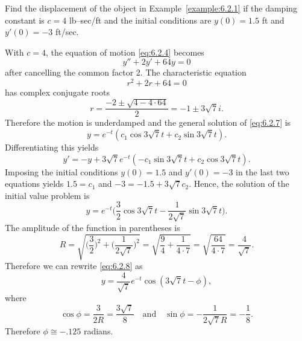 \documentclass{ximera}
\begin{document}
\begin{example}
\label{example:6.2.2}
Find the displacement of the object in Example~\ref{example:6.2.1} if the
damping constant is $c=4$ lb--sec/ft and the initial conditions are
$y(0)=1.5$ ft and $y'(0)=-3$ ft/sec.
 
\begin{explanation}
With $c=4$, the equation of motion \eqref{eq:6.2.4} becomes
\begin{equation}\label{eq:6.2.7}
y''+2y'+64y=0
\end{equation}
after cancelling the common factor 2. The characteristic equation
$$
r^2+2r+64=0
$$
has complex conjugate roots
$$
r=\frac{-2\pm\sqrt{4-4\cdot64}}{2}=-1\pm3\sqrt7i.
$$
Therefore the motion is underdamped and the
general solution of  \eqref{eq:6.2.7} is
$$
y=e^{-t}(c_1\cos3\sqrt7t+c_2\sin3\sqrt7t).
$$
Differentiating this yields
$$
y'=-y+3\sqrt7e^{-t}(-c_1\sin3\sqrt7t+c_2\cos3\sqrt7t).
$$
Imposing the initial conditions $y(0)=1.5$ and $y'(0)=-3$ in the last
two equations yields $1.5=c_1$ and $-3=-1.5+3\sqrt7c_2$. Hence, the
solution of the initial value problem is
\begin{equation}\label{eq:6.2.8}
y=e^{-t}\bigg(\frac{3}{2}\cos3\sqrt7t-\frac{1}{2\sqrt7}
\sin3\sqrt7t\bigg).
\end{equation}
 The amplitude of the function in parentheses is
$$
 R=\sqrt{\bigg(\frac{3}{2}\bigg)^2+\bigg(\frac{1}{2\sqrt7}\bigg)^2}
=\sqrt{\frac{9}{4}+\frac{1}{4\cdot7}}
=\sqrt{\frac{64}{4\cdot7}}=\frac{4}{\sqrt7}.
$$
Therefore we can rewrite  \eqref{eq:6.2.8} as
$$
y=\frac{4}{\sqrt7}e^{-t}\cos(3\sqrt7t-\phi),
$$
 where
$$
\cos\phi=\frac{3}{2R}=\frac{3\sqrt{7}}{8}\quad\mbox{and}\quad\sin\phi=-\frac{1}{2\sqrt{7}R}=
-\frac{1}{8}.
$$
Therefore $\phi\cong-.125$  radians.
\end{explanation}
\end{example}
 
\end{document}
